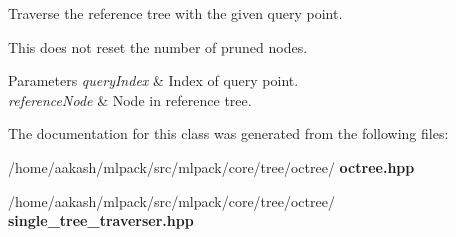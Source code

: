 Traverse the reference tree with the given query point. 

This does not reset the number of pruned nodes.


\begin{DoxyParams}{Parameters}
{\em query\+Index} & Index of query point. \\
\hline
{\em reference\+Node} & Node in reference tree. \\
\hline
\end{DoxyParams}


The documentation for this class was generated from the following files\+:\begin{DoxyCompactItemize}
\item 
/home/aakash/mlpack/src/mlpack/core/tree/octree/\textbf{ octree.\+hpp}\item 
/home/aakash/mlpack/src/mlpack/core/tree/octree/\textbf{ single\+\_\+tree\+\_\+traverser.\+hpp}\end{DoxyCompactItemize}
